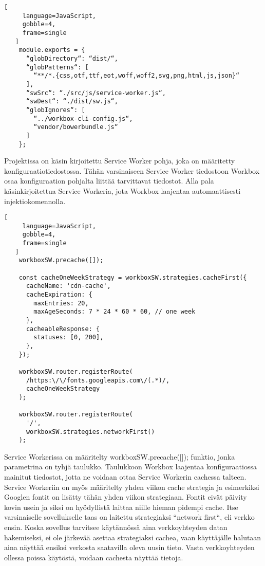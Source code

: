 \documentclass{tktltiki}
\begin{document}
\begin{lstlisting}[
     language=JavaScript,
     gobble=4,
     frame=single
   ]
    module.exports = {
      “globDirectory“: “dist/“,
      “globPatterns“: [
        “**/*.{css,otf,ttf,eot,woff,woff2,svg,png,html,js,json}“
      ],
      “swSrc“: “./src/js/service-worker.js“,
      “swDest“: “./dist/sw.js“,
      “globIgnores“: [
        “../workbox-cli-config.js“,
        “vendor/bowerbundle.js“
      ]
    };
\end{lstlisting}

Projektissa on käsin kirjoitettu Service Worker pohja, joka on määritetty konfiguraatiotiedostossa. Tähän varsinaiseen Service Worker tiedostoon Workbox osaa konfiguraation pohjalta liittää tarvittavat tiedostot. Alla pala käsinkirjoitettua Service Workeria, jota Workbox laajentaa automaattisesti injektiokomennolla.

\begin{lstlisting}[
     language=JavaScript,
     gobble=4,
     frame=single
   ]
    workboxSW.precache([]);
    
    const cacheOneWeekStrategy = workboxSW.strategies.cacheFirst({
      cacheName: 'cdn-cache',
      cacheExpiration: {
        maxEntries: 20,
        maxAgeSeconds: 7 * 24 * 60 * 60, // one week
      },
      cacheableResponse: {
        statuses: [0, 200],
      },
    });
    
    workboxSW.router.registerRoute(
      /https:\/\/fonts.googleapis.com\/(.*)/,
      cacheOneWeekStrategy
    );
    
    workboxSW.router.registerRoute(
      '/',
      workboxSW.strategies.networkFirst()
    );
\end{lstlisting}

Service Workerissa on määritelty workboxSW.precache([]); funktio, jonka parametrina on tyhjä taulukko. Taulukkoon Workbox laajentaa konfiguraatiossa mainitut tiedostot, jotta ne voidaan ottaa Service Workerin cachessa talteen. Service Workeriin on myös määritelty yhden viikon cache strategia ja esimerkiksi Googlen fontit on lisätty tähän yhden viikon strategiaan. Fontit eivät päivity kovin usein ja siksi on hyödyllistä laittaa niille hieman pidempi cache. Itse varsinaiselle sovellukselle taas on laitettu strategiaksi “network first“, eli verkko ensin. Koska sovellus tarvitsee käytännössä aina verkkoyhteyden datan hakemiseksi, ei ole järkevää asettaa strategiaksi cachea, vaan käyttäjälle halutaan aina näyttää ensiksi verkosta saatavilla oleva uusin tieto. Vasta verkkoyhteyden ollessa poissa käytöstä, voidaan cachesta näyttää tietoja. 
\end{document}
